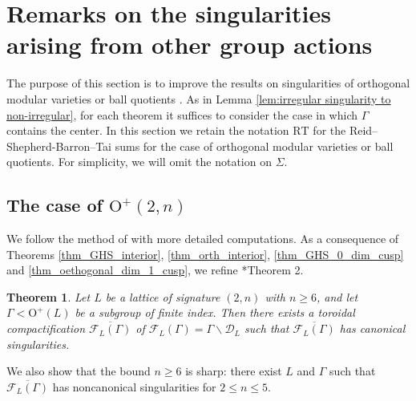 \documentclass[11pt]{amsart}
\theoremstyle{plain}
\newtheorem{thm}{Theorem}[section]
\theoremstyle{definition}
\numberwithin{equation}{section}
\def\O{\mathrm{O}}
\newcommand{\calF}{\mathcal{F}}
\begin{document}
\section{Remarks on the singularities arising from other group actions}
\label{sec:other_groups}
The purpose of this section is to improve the results on singularities of orthogonal modular varieties \cite{Gritsenko2007kodaira} or ball quotients \cite{behrens2012singularities}.
As in Lemma \ref{lem:irregular singularity to non-irregular}, for each theorem it suffices to consider the case in which $\Gamma$ contains the center.
In this section we retain the notation $\mathrm{RT}$ for the Reid--Shepherd-Barron--Tai sums for the case of orthogonal modular varieties or ball quotients.
For simplicity, we will omit the notation on $\Sigma$.
\subsection{The case of \texorpdfstring{$\O^+(2,n)$}{}}

We follow the method of \cite{Gritsenko2007kodaira} with more detailed computations.
As a consequence of Theorems \ref{thm_GHS_interior}, \ref{thm_orth_interior}, \ref{thm_GHS_0_dim_cusp} and \ref{thm_oethogonal_dim_1_cusp}, we refine \cite{Gritsenko2007kodaira}*{Theorem 2}.

\begin{thm}
\label{thm:orthogonal_refinement}
    Let $L$ be a lattice of signature $(2,n)$ with $n \geq 6$, and let $\Gamma < \mathrm{O}^+(L)$ be a subgroup of finite index.
        Then there exists a toroidal compactification $\overline{\calF_L(\Gamma)}$ of $\calF_L(\Gamma)=\Gamma\backslash\mathcal{D}_L$ such that $\overline{\calF_L(\Gamma)}$ has canonical singularities.
\end{thm}

We also show that the bound $n\geq6$ is sharp: there exist $L$ and $\Gamma$ such that $\overline{\calF_L(\Gamma)}$ has noncanonical singularities for $2\leq n \leq 5$.
\end{document}
